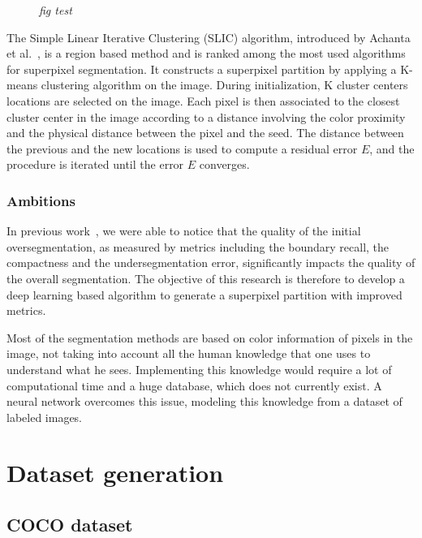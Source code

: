 \documentclass{article}
\begin{document}
            \begin{figure}[!ht]
                \centering
                \caption{\textit{fig test}}
            \end{figure}

            The Simple Linear Iterative Clustering (SLIC) algorithm, introduced by Achanta et al.~\cite{achanta2012,achanta2017}, is a region based method and is ranked among the most used algorithms for superpixel segmentation. It constructs a superpixel partition by applying a K-means clustering algorithm on the image. During initialization, K cluster centers locations are selected on the image. Each pixel is then associated to the closest cluster center in the image according to a distance involving the color proximity and the physical distance between the pixel and the seed. The distance between the previous and the new locations is used to compute a residual error $E$, and the procedure is iterated until the error $E$ converges.

        \subsubsection{Ambitions}
            In previous work~\cite{chang2019}, we were able to notice that the quality of the initial oversegmentation, as measured by metrics including the boundary recall, the compactness and the undersegmentation error, significantly impacts the quality of the overall segmentation. The objective of this research is therefore to develop a deep learning based algorithm to generate a superpixel partition with improved metrics.
            \par
            Most of the segmentation methods are based on color information of pixels in the image, not taking into account all the human knowledge that one uses to understand what he sees. Implementing this knowledge would require a lot of computational time and a huge database, which does not currently exist. A neural network overcomes this issue, modeling this knowledge from a dataset of labeled images.


\newpage
\section{Dataset generation}
    \subsection{COCO dataset}
\end{document}

